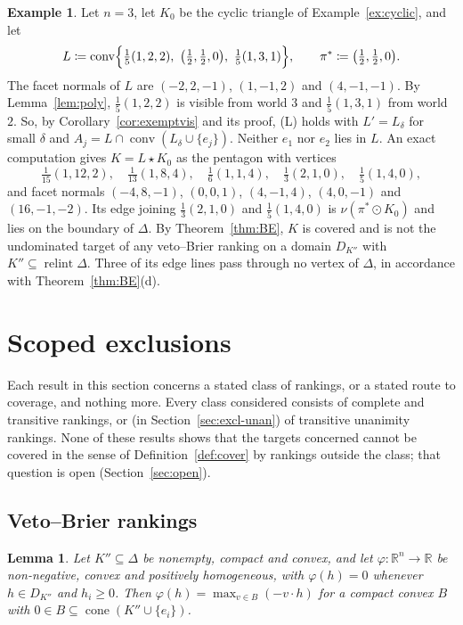 \documentclass[11pt]{article}
\newcommand{\R}{\mathbb{R}}
\DeclareMathOperator{\conv}{conv}
\DeclareMathOperator{\cone}{cone}
\DeclareMathOperator{\relint}{relint}
\theoremstyle{plain}
\newtheorem{lemma}[theorem]{Lemma}
\theoremstyle{definition}
\newtheorem{example}[theorem]{Example}
\theoremstyle{remark}
\begin{document}
\begin{example}\label{ex:pentagon}
Let $n=3$, let $K_0$ be the cyclic triangle of Example~\ref{ex:cyclic}, and let
\[
  L\coloneqq\conv\Bigl\{\tfrac15(1,2,2),\ \bigl(\tfrac12,\tfrac12,0\bigr),\
  \tfrac15(1,3,1)\Bigr\},\qquad \pi^\ast\coloneqq\bigl(\tfrac12,\tfrac12,0\bigr).
\]
The facet normals of $L$ are $(-2,2,-1)$, $(1,-1,2)$ and $(4,-1,-1)$. By
Lemma~\ref{lem:poly}, $\frac15(1,2,2)$ is visible from world $3$ and $\frac15(1,3,1)$ from
world $2$. So, by Corollary~\ref{cor:exemptvis} and its proof, (L) holds with
$L'=L_\delta$ for small $\delta$ and $A_j=L\cap\conv(L_\delta\cup\{e_j\})$. Neither $e_1$
nor $e_2$ lies in $L$. An exact computation gives $K=L\star K_0$ as the pentagon with
vertices
\[
  \tfrac1{15}(1,12,2),\quad\tfrac1{13}(1,8,4),\quad\tfrac16(1,1,4),\quad
  \tfrac13(2,1,0),\quad\tfrac15(1,4,0),
\]
and facet normals $(-4,8,-1)$, $(0,0,1)$, $(4,-1,4)$, $(4,0,-1)$ and $(16,-1,-2)$. Its
edge joining $\frac13(2,1,0)$ and $\frac15(1,4,0)$ is $\nu(\pi^\ast\odot K_0)$ and lies on
the boundary of $\Delta$. By Theorem~\ref{thm:BE}, $K$ is covered and is not the
undominated target of any veto--Brier ranking on a domain $D_{K''}$ with
$K''\subseteq\relint\Delta$. Three of its edge lines pass through no vertex of $\Delta$, in
accordance with Theorem~\ref{thm:BE}(d).
\end{example}

\section{Scoped exclusions}\label{sec:excl}

Each result in this section concerns a stated class of rankings, or a stated route to
coverage, and nothing more. Every class considered consists of complete and transitive
rankings, or (in Section~\ref{sec:excl-unan}) of transitive unanimity rankings. None of
these results shows that the targets concerned cannot be covered in the sense of
Definition~\ref{def:cover} by rankings outside the class; that question is open
(Section~\ref{sec:open}).

\subsection{Veto--Brier rankings}\label{sec:excl-vb}

\begin{lemma}\label{lem:sublinear}
Let $K''\subseteq\Delta$ be nonempty, compact and convex, and let $\varphi:\R^n\to\R$ be
non-negative, convex and positively homogeneous, with $\varphi(h)=0$ whenever $h\in
D_{K''}$ and $h_i\ge0$. Then $\varphi(h)=\max_{v\in B}(-v\cdot h)$ for a compact convex $B$
with $0\in B\subseteq\cone(K''\cup\{e_i\})$.
\end{lemma}
\end{document}
